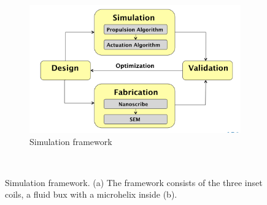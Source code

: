 \documentclass[12pt,a4paper,titlepage]{report}
\begin{document}
\begin{figure}
        \centering
        \begin{subfigure}[b]{1.0\textwidth}
                \includegraphics[width=\textwidth]{overview_Dig1}
                \caption{Simulation framework}
                \label{simulation}
        \end{subfigure}~~ 

    
      
        \caption[Simulation framework]{Simulation framework. (a) The framework consists of the three inset coils,
a fluid bux with a microhelix inside (b).}\label{Simulation framework}

       

\end{figure}
\end{document}
